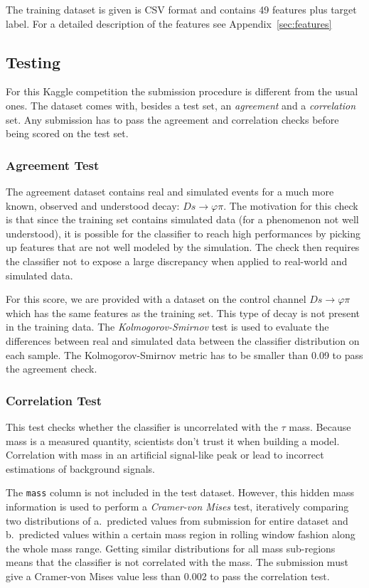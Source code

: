 \documentclass[conference]{IEEEtran}
\begin{document}
The training dataset is given is CSV format and contains 49 features plus target
label. For a detailed description of the features see
Appendix~\ref{sec:features}

\subsection{Testing}
For this Kaggle competition the submission procedure is different from the usual
ones. The dataset comes with, besides a test set, an \textit{agreement} and a
\textit{correlation} set. Any submission has to pass the agreement and
correlation checks before being scored on the test set.

\subsubsection{Agreement Test}
\label{sec:agreement}
The agreement dataset contains real and simulated events for a much more known,
observed and understood decay: $Ds \rightarrow \varphi\pi$. The motivation for
this check is that since the training set contains simulated data (for a
phenomenon not well understood), it is possible for the classifier to reach high
performances by picking up features that are not well modeled by the simulation.
The check then requires the classifier not to expose a large discrepancy when
applied to real-world and simulated data.

For this score, we are provided with a dataset on the control channel $Ds
\rightarrow \varphi\pi$ which has the same features as the training set. This
type of decay is not present in the training data. The
\textit{Kolmogorov-Smirnov} test is used to evaluate the differences between
real and simulated data between the classifier distribution on each sample.
The Kolmogorov-Smirnov metric has to be smaller than 0.09 to pass the agreement
check.

\subsubsection{Correlation Test}
\label{sec:correlation}
This test checks whether the classifier is uncorrelated with the $\tau$ mass.
Because mass is a measured quantity, scientists don't trust it when building a
model. Correlation with mass in an artificial signal-like peak or lead to
incorrect estimations of background signals.

The \texttt{mass} column is not included in the test dataset. However, this hidden
mass information is used to perform a \textit{Cramer-von Mises} test,
iteratively comparing two distributions of a.\ predicted values from submission
for entire dataset and b.\ predicted values within a certain mass region in
rolling window fashion along the whole mass range. Getting similar distributions
for all mass sub-regions means that the classifier is not correlated with the
mass. The submission must give a Cramer-von Mises value less than 0.002 to pass
the correlation test.
\end{document}
